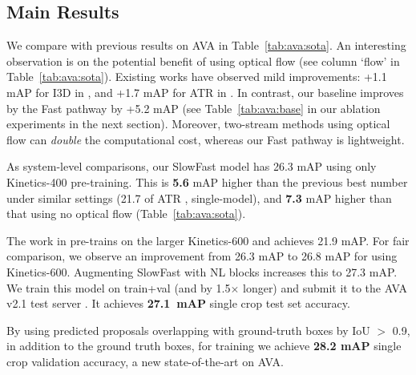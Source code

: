 \documentclass[10pt,twocolumn,letterpaper]{article}
\newcommand{\tblref}[1]{Table~\ref{#1}}
\begin{document}
	\subsection{Main Results}
	
	We compare with previous results on AVA in \tblref{tab:ava:sota}. An interesting observation is on the potential benefit of using optical flow (see column `flow' in \tblref{tab:ava:sota}). Existing works have observed mild improvements: +1.1 mAP for I3D in \cite{Gu2018}, and +1.7 mAP for ATR in \cite{Jiang2018}. In contrast, our baseline improves by the Fast pathway by +5.2 mAP (see \tblref{tab:ava:base} in our ablation experiments in the next section). Moreover, two-stream methods using optical flow can \emph{double} the computational cost, whereas our Fast pathway is lightweight.
	
	As system-level comparisons, our SlowFast model has 26.3 mAP using only Kinetics-400 pre-training. This is \textbf{5.6} mAP higher than the previous best number under similar settings (21.7 of ATR \cite{Jiang2018}, single-model), and \textbf{7.3} mAP higher than that using no optical flow (\tblref{tab:ava:sota}). 
	
	The work in \cite{Girdhar2018} pre-trains on the larger Kinetics-600 and achieves 21.9 mAP. For fair comparison, we observe an improvement from 26.3 mAP to 26.8 mAP for using Kinetics-600. Augmenting SlowFast with NL blocks \cite{Wang2018} increases this to 27.3 mAP. 
	We train this model on train+val (and by 1.5$\times$ longer) and submit it to the AVA v2.1 test server \cite{AVALeaverboard2018}. It achieves \textbf{27.1~mAP} single crop test set accuracy. 
	
	By using predicted proposals overlapping with ground-truth boxes by IoU $>$ 0.9, in addition to the ground truth boxes, for training we achieve \textbf{28.2 mAP} single crop validation accuracy, a new state-of-the-art on AVA. 
	
\end{document}
